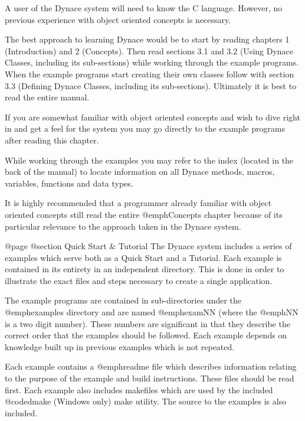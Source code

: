 A user of the Dynace system will need to know the C language.  However,
no previous experience with object oriented concepts is necessary.

The best approach to learning Dynace would be to start by reading
chapters 1 (Introduction) and 2 (Concepts).  Then read sections 3.1 and
3.2 (Using Dynace Classes, including its sub-sections) while working
through the example programs.  When the example programs start creating
their own classes follow with section 3.3 (Defining Dynace Classes,
including its sub-sections).  Ultimately it is best to read the entire
manual.

If you are somewhat familiar with object oriented concepts and wish
to dive right in and get a feel for the system you may go directly
to the example programs after reading this chapter.

While working through the examples you may refer to the index (located
in the back of the manual) to locate information on all Dynace methods,
macros, variables, functions and data types.


It is highly recommended that a programmer already familiar with object
oriented concepts still read the entire @emph{Concepts} chapter because
of its particular relevance to the approach taken in the Dynace system.







@page
@section Quick Start & Tutorial
The Dynace system includes a series of examples which serve both as a
Quick Start and a Tutorial.  Each example is contained in its entirety
in an independent directory.  This is done in order to illustrate the
exact files and steps necessary to create a single application.

The example programs are contained in sub-directories under the
@emph{examples} directory and are named @emph{examNN} (where the
@emph{NN} is a two digit number).  These numbers are significant in that
they describe the correct order that the examples should be followed.
Each example depends on knowledge built up in previous examples which is
not repeated.

Each example contains a @emph{readme} file which describes information
relating to the purpose of the example and build instructions.  These
files should be read first.  Each example also includes makefiles
which are used by the included @code{dmake} (Windows only) make utility.
The source to the examples is also included.

